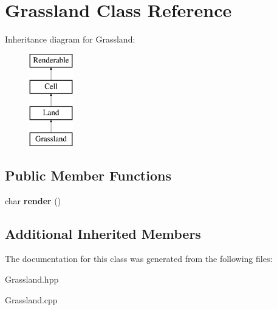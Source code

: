 \hypertarget{class_grassland}{}\section{Grassland Class Reference}
\label{class_grassland}
Inheritance diagram for Grassland\+:\begin{figure}[H]
\begin{center}
\leavevmode
\includegraphics[height=4.000000cm]{class_grassland}
\end{center}
\end{figure}
\subsection*{Public Member Functions}
\begin{DoxyCompactItemize}
\item 
\mbox{\label{class_grassland_a67098cf4cc401018ea41e63f51361684}} 
char {\bfseries render} ()
\end{DoxyCompactItemize}
\subsection*{Additional Inherited Members}


The documentation for this class was generated from the following files\+:\begin{DoxyCompactItemize}
\item 
Grassland.\+hpp\item 
Grassland.\+cpp\end{DoxyCompactItemize}
